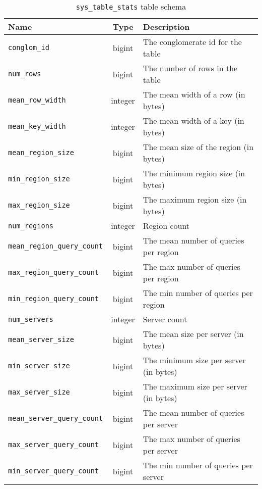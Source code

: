 \begin{table}
				\begin{tabular}{|l|c|p{6cm}|}
								\hline
								\bf{Name}														& \bf{Type}	&	\bf{Description} \\ \hline	
								\texttt{conglom\_id}								&	bigint		&	The conglomerate id for the table \\ \hline
								\texttt{num\_rows}									&	bigint		&	The number of rows in the table \\ \hline
								\texttt{mean\_row\_width}						&	integer		&	The mean width of a row (in bytes) 	\\ \hline
								\texttt{mean\_key\_width}						&	integer		&	The mean width of a key (in bytes) \\ \hline
								\texttt{mean\_region\_size}					&	bigint		&	The mean size of the region (in bytes) \\ \hline
								\texttt{min\_region\_size}					&	bigint		&	The minimum region size (in bytes) \\ \hline
								\texttt{max\_region\_size}					&	bigint		&	The maximum region size (in bytes) \\ \hline
								\texttt{num\_regions}								&	integer		&	Region count	\\	\hline
								\texttt{mean\_region\_query\_count}	&	bigint		&	The mean number of queries per region \\ \hline
								\texttt{max\_region\_query\_count}	&	bigint		&	The max number of queries per region \\ \hline
								\texttt{min\_region\_query\_count}	&	bigint		&	The min number of queries per region \\ \hline
								\texttt{num\_servers}								&	integer		&	Server count \\ \hline
								\texttt{mean\_server\_size}					&	bigint		&	The mean size per server (in bytes) \\ \hline
								\texttt{min\_server\_size}					&	bigint		&	The minimum size per server (in bytes) \\ \hline
								\texttt{max\_server\_size}					&	bigint		&	The maximum size per server (in bytes) \\ \hline
								\texttt{mean\_server\_query\_count}	&	bigint		&	The mean number of queries per server  \\ \hline
								\texttt{max\_server\_query\_count}	&	bigint		&	The max number of queries per server \\ \hline
								\texttt{min\_server\_query\_count}	&	bigint		&	The min number of queries per server \\ \hline
				\end{tabular}
				\caption{\texttt{sys\_table\_stats} table schema}
				\label{table:tableStats}
\end{table}
